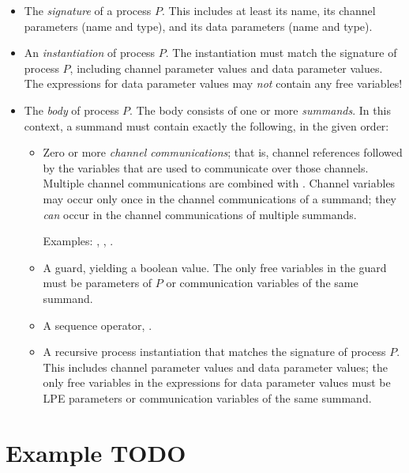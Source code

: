 \begin{itemize}

\item The \emph{signature} of a process $P$.
This includes at least its name, its channel parameters (name and type), and its data parameters (name and type).

\item An \emph{instantiation} of process $P$.
The instantiation must match the signature of process $P$, including channel parameter values and data parameter values.
The expressions for data parameter values may \emph{not} contain any free variables!

\item The \emph{body} of process $P$.
The body consists of one or more \emph{summands}.
In this context, a summand must contain exactly the following, in the given order:

\begin{itemize}

\item Zero or more \emph{channel communications}; that is, channel references followed by the variables that are used to communicate over those channels.
Multiple channel communications are combined with \inlinecode{|}.
Channel variables may occur only once in the channel communications of a summand; they \emph{can} occur in the channel communications of multiple summands.

Examples: , , .

\item A guard, yielding a boolean value.
The only free variables in the guard must be parameters of $P$ or communication variables of the same summand.

\item A sequence operator, \inlinecode{>->}.

\item A recursive process instantiation that matches the signature of process $P$.
This includes channel parameter values and data parameter values; the only free variables in the expressions for data parameter values must be LPE parameters or communication variables of the same summand.

\end{itemize}

\end{itemize}

\section{Example TODO}

